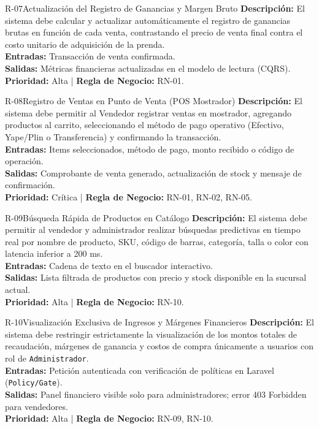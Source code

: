\begin{reqbox}{R-07}{Actualización del Registro de Ganancias y Margen Bruto}
\textbf{Descripción:} El sistema debe calcular y actualizar automáticamente el registro de ganancias brutas en función de cada venta, contrastando el precio de venta final contra el costo unitario de adquisición de la prenda.\\
\textbf{Entradas:} Transacción de venta confirmada.\\
\textbf{Salidas:} Métricas financieras actualizadas en el modelo de lectura (CQRS).\\
\textbf{Prioridad:} Alta | \textbf{Regla de Negocio:} RN-01.
\end{reqbox}

\begin{reqbox}{R-08}{Registro de Ventas en Punto de Venta (POS Mostrador)}
\textbf{Descripción:} El sistema debe permitir al Vendedor registrar ventas en mostrador, agregando productos al carrito, seleccionando el método de pago operativo (Efectivo, Yape/Plin o Transferencia) y confirmando la transacción.\\
\textbf{Entradas:} Items seleccionados, método de pago, monto recibido o código de operación.\\
\textbf{Salidas:} Comprobante de venta generado, actualización de stock y mensaje de confirmación.\\
\textbf{Prioridad:} Crítica | \textbf{Regla de Negocio:} RN-01, RN-02, RN-05.
\end{reqbox}

\begin{reqbox}{R-09}{Búsqueda Rápida de Productos en Catálogo}
\textbf{Descripción:} El sistema debe permitir al vendedor y administrador realizar búsquedas predictivas en tiempo real por nombre de producto, SKU, código de barras, categoría, talla o color con latencia inferior a 200 ms.\\
\textbf{Entradas:} Cadena de texto en el buscador interactivo.\\
\textbf{Salidas:} Lista filtrada de productos con precio y stock disponible en la sucursal actual.\\
\textbf{Prioridad:} Alta | \textbf{Regla de Negocio:} RN-10.
\end{reqbox}

\begin{reqbox}{R-10}{Visualización Exclusiva de Ingresos y Márgenes Financieros}
\textbf{Descripción:} El sistema debe restringir estrictamente la visualización de los montos totales de recaudación, márgenes de ganancia y costos de compra únicamente a usuarios con rol de \texttt{Administrador}.\\
\textbf{Entradas:} Petición autenticada con verificación de políticas en Laravel (\texttt{Policy/Gate}).\\
\textbf{Salidas:} Panel financiero visible solo para administradores; error 403 Forbidden para vendedores.\\
\textbf{Prioridad:} Alta | \textbf{Regla de Negocio:} RN-09, RN-10.
\end{reqbox}

